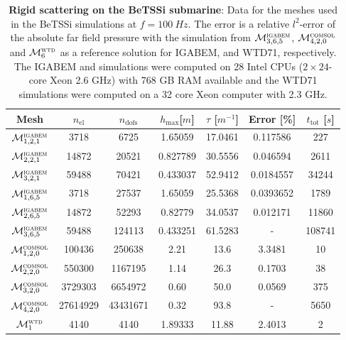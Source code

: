 \begin{table}
	\centering
	\caption{\textbf{Rigid scattering on the BeTSSi submarine}: Data for the meshes used in the BeTSSi simulations at $f=\SI{100}{Hz}$. The error is a relative $l^2$-error of the absolute far field pressure with the simulation from ${\cal M}_{3,6,5}^{\textsc{igabem}}$, ${\cal M}_{4,2,0}^{\textsc{comsol}}$ and ${\cal M}_{6}^{\textsc{wtd}}$ as a reference solution for IGABEM, \COMSOL and WTD71, respectively. The IGABEM and \COMSOL simulations were computed on 28 Intel CPUs ($2\times 24$-core Xeon 2.6 GHz) with 768 GB RAM available and the WTD71 simulations were computed on a 32 core Xeon computer with 2.3 GHz.}
	\label{Tab3:BeTSSiComputationalData}
	\begin{tabular}{c S[table-format = 8.0] S[table-format = 8.0] S[table-format = 1.2,round-mode=places,round-precision=2] S[table-format = 3.1,round-mode=places,round-precision=1] S[table-format = 2.4,round-mode=places,round-precision=4] S[table-format = 6.0]}
		\toprule
		Mesh & {$n_{\mathrm{el}}$} & {$n_{\mathrm{dofs}}$} & {$h_{\mathrm{max}}$[$\si{m}$]}  & {$\tau$ [$\si{m^{-1}}$]}  & {Error [\%]}  & {$t_{\mathrm{tot}}$ [$\si{s}$]}\\
		\hline
		${\cal M}_{1,2,1}^{\textsc{igabem}}$ & 3718 & 6725 & 1.65059 & 17.0461 & 0.117586 & 227\\
		${\cal M}_{2,2,1}^{\textsc{igabem}}$ & 14872 & 20521 & 0.827789 & 30.5556 & 0.046594 & 2611\\
		${\cal M}_{3,2,1}^{\textsc{igabem}}$ & 59488 & 70421 & 0.433037 & 52.9412 & 0.0184557 & 34244\\
		${\cal M}_{1,6,5}^{\textsc{igabem}}$ & 3718 & 27537 & 1.65059 & 25.5368 & 0.0393652 & 1789\\
		${\cal M}_{2,6,5}^{\textsc{igabem}}$ & 14872 & 52293 & 0.82779 & 34.0537 & 0.012171 & 11860\\
		${\cal M}_{3,6,5}^{\textsc{igabem}}$ & 59488 & 124113 & 0.433251 & 61.5283 & {-} & 108741\\
		${\cal M}_{1,2,0}^{\textsc{comsol}}$ & 100436 & 250638 & 2.21 & 13.6 & 3.3481 & 10\\
		${\cal M}_{2,2,0}^{\textsc{comsol}}$ & 550300 & 1167195 & 1.14 & 26.3 & 0.1703 & 38\\
		${\cal M}_{3,2,0}^{\textsc{comsol}}$ & 3729303 & 6654972 & 0.60 & 50.0 & 0.0569 & 375\\
		${\cal M}_{4,2,0}^{\textsc{comsol}}$ & 27614929 & 43431671 & 0.32 & 93.8 & {-} & 5650\\
		${\cal M}_{1}^{\textsc{wtd}}$ 		& 4140 & 4140 & 1.89333 & 11.88 & 2.4013 & 2\\

\end{tabular}
\end{table}
